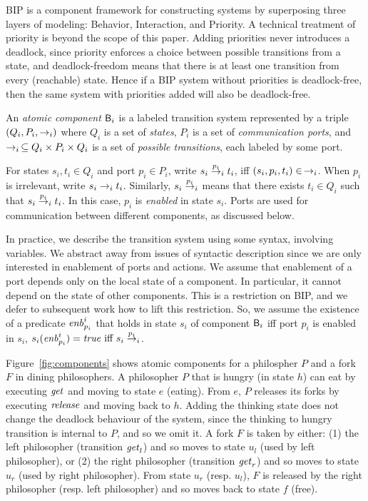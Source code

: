
BIP is a component framework for constructing
systems by superposing three layers of modeling: Behavior,
Interaction, and Priority.
%
A technical treatment of priority is beyond the scope of this paper. Adding
priorities never introduces a deadlock, since priority enforces a choice between
possible transitions from a state, and deadlock-freedom means that there is at
least one transition from every (reachable) state.  Hence if a BIP system
without priorities is deadlock-free, then the same system with priorities
added will also be deadlock-free.

An  {\em atomic component} $\B_i$ is a labeled transition system represented by a triple
$(Q_i, P_i, \goesto_i)$ where $Q_i$ is a set of {\em states}, $P_i$ is a set of {\em communication ports}, and
$\goesto_i\, \subseteq Q_i \times P_i \times Q_i$ is a set of {\em possible transitions}, each labeled by some port.
\ed

For states $s_i, t_i \in Q_i$ and port $p_i \in P_i$, write $s_i  \goesto[p_i]_i t_i$, iff
$(s_i,p_i,t_i) \in\,\goesto_i$. When $p_i$ is irrelevant, write 
$s_i \goesto_i t_i$. Similarly, $s_i \goesto[p_i]_i$ means that there
exists $t_i \in Q_i$ such that
$s_i \goesto[p_i]_i t_i$. In this case, $p_i$ is \emph{enabled} in state $s_i$.
Ports are used for communication between different components, as
discussed below.

In practice, we describe the transition system using some syntax, \eg
involving variables.  We abstract away from issues of syntactic
description since we are only interested in enablement of ports and
actions. We assume that enablement of a port depends only on the local
state of a component. In particular, it cannot depend on the state of
other components. This is a restriction on BIP, and we defer to
subsequent work how to lift this restriction.  So, we assume the
existence of a predicate $\gd{p_i}{i}$ that holds 
in state $s_i$ of component $\B_i$ iff port $p_i$ is enabled in $s_i$, 
\ie $s_i(\gd{p_i}{i}) = \true \mbox{ iff } s_i \goesto[p_i]_i$.

Figure~\ref{fig:components} shows atomic components for a philospher $P$
and a fork $F$ in dining philosophers.
%
A philosopher $P$ that is hungry (in state $h$) can eat by
executing $\get$ and moving to state $e$ (eating). From $e$, $P$
releases its forks by executing $\release$ and moving back to $h$.
%
Adding the thinking state does not change the deadlock behaviour of the system, since the
thinking to hungry transition is internal to $P$, and so we omit it.
%
A fork $F$ is taken by either: (1) the left philosopher 
(transition $\get_l$) and so moves to state $u_l$ (used by left
philosopher), or (2) the right philosopher  (transition
$\get_r$) and so moves to state $u_r$ (used by right
philosopher). From state $u_r$ (resp. $u_l$), $F$ is released by the
right philosopher (resp. left philosopher) and so moves back to
state $f$ (free).



